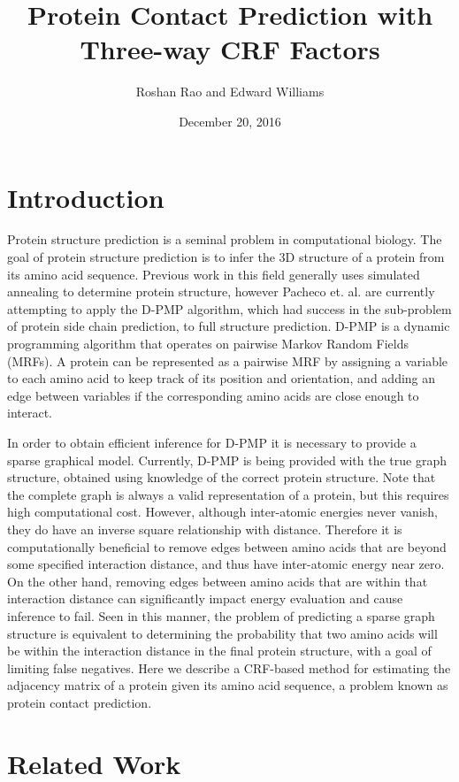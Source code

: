 \documentclass{article}
\title{Protein Contact Prediction with Three-way CRF Factors}
\date{December 20, 2016}
\author{Roshan Rao and Edward Williams}
\begin{document}
\maketitle

\section{Introduction}
\vspace*{-0.1in}
Protein structure prediction is a seminal problem in computational biology. The goal of protein structure prediction is to infer the 3D structure of a protein from its amino acid sequence. Previous work in this field generally uses simulated annealing to determine protein structure, however Pacheco et. al. are currently attempting to apply the D-PMP algorithm, which had success in the sub-problem of protein side chain prediction, to full structure prediction. D-PMP is a dynamic programming algorithm that operates on pairwise Markov Random Fields (MRFs). A protein can be represented as a pairwise MRF by assigning a variable to each amino acid to keep track of its position and orientation, and adding an edge between variables if the corresponding amino acids are close enough to interact. 

In order to obtain efficient inference for D-PMP it is necessary to provide a sparse graphical model. Currently, D-PMP is being provided with the true graph structure, obtained using knowledge of the correct protein structure. Note that the complete graph is always a valid representation of a protein, but this requires high computational cost. However, although inter-atomic energies never vanish, they do have an inverse square relationship with distance. Therefore it is computationally beneficial to remove edges between amino acids that are beyond some specified interaction distance, and thus have inter-atomic energy near zero. On the other hand, removing edges between amino acids that are within that interaction distance can significantly impact energy evaluation and cause inference to fail. Seen in this manner, the problem of predicting a sparse graph structure is equivalent to determining the probability that two amino acids will be within the interaction distance in the final protein structure, with a goal of limiting false negatives. Here we describe a CRF-based method for estimating the adjacency matrix of a protein given its amino acid sequence, a problem known as protein contact prediction.
\section{Related Work}
\end{document}
